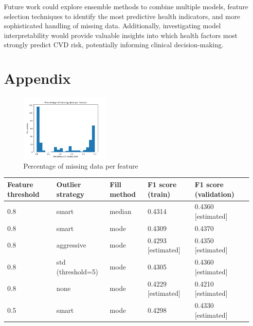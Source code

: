\documentclass[10pt,conference,compsocconf]{IEEEtran}
\begin{document}
Future work could explore ensemble methods to combine multiple models, feature selection techniques to identify the most predictive health indicators, and more sophisticated handling of missing data. Additionally, investigating model interpretability would provide valuable insights into which health factors most strongly predict CVD risk, potentially informing clinical decision-making.

\clearpage
\section{Appendix}


\begin{figure}[h]
    \centering
    \includegraphics[width=0.4\textwidth]{Missing_data.png}  

    \caption{Percentage of missing data per feature}

    \label{fig:missing}  

\end{figure}



\vspace{0.5cm}

\noindent\begin{minipage}{\textwidth}
\centering
\begin{tabular}[c]{|l||l|l|l|l|}
  \hline
  Feature threshold & Outlier strategy & Fill method & F1 score (train) & F1 score (validation) \\
  \hline
  0.8 & smart & median & 0.4314 & 0.4360 [estimated]\\ 
  0.8 & smart & mode & 0.4309 & 0.4370 \\ 
  0.8 & aggressive & mode & 0.4293 [estimated] & 0.4350 [estimated] \\ 
  0.8 & std (threshold=5) & mode & 0.4305 & 0.4360 [estimated] \\ 
  0.8 & none & mode & 0.4229 [estimated] & 0.4210 [estimated] \\ 
  0.5 & smart & mode & 0.4298 & 0.4330 [estimated] \\ 
  \hline
\end{tabular}
\label{tab:preprocessing_strategies}
\end{minipage}
\end{document}
